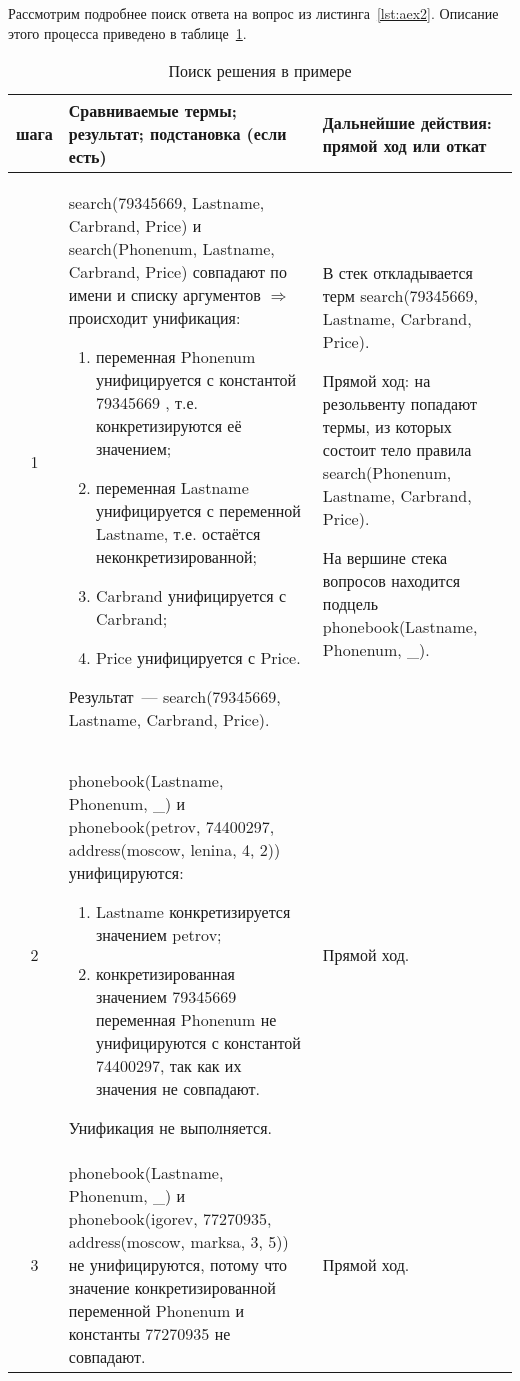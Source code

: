 Рассмотрим подробнее поиск ответа на вопрос из листинга~\ref{lst:aex2}. Описание этого процесса приведено в таблице~\ref{tbl:ex1}.
\renewcommand{\arraystretch}{1.75}
\footnotesize
\begin{longtable}{|c|p{}|p{}|}
    \caption{Поиск решения в примере }\label{tbl:ex1} \\
    \hline
    \textnumero{} шага & Сравниваемые термы; результат; подстановка (если есть)  & Дальнейшие действия: прямой ход или откат \\
    \hline
        1 & search(79345669, Lastname, Carbrand, Price) и search(Phonenum, Lastname, Carbrand, Price) совпадают по имени и списку аргументов $\Rightarrow$ происходит унификация:
        \begin{enumerate}[label=\arabic*)]
			\item переменная Phonenum унифицируется с константой 79345669 , т.е. конкретизируются её значением;
			\item переменная Lastname унифицируется с переменной Lastname, т.е. остаётся неконкретизированной;
			\item Carbrand унифицируется с Carbrand;
			\item Price унифицируется с Price.
 		\end{enumerate}
        Результат~--- search(79345669, Lastname, Carbrand, Price). &
        В стек откладывается терм search(79345669, Lastname, Carbrand, Price).

        Прямой ход: на резольвенту попадают термы, из которых состоит тело правила search(Phonenum, Lastname, Carbrand, Price).

        На вершине стека вопросов находится подцель phonebook(Lastname, Phonenum, \_).
        \\ \hline
        2 & phonebook(Lastname, Phonenum, \_) и phonebook(petrov, 74400297, address(moscow,    lenina,       4,  2)) унифицируются:
        \begin{enumerate}[label=\arabic*)]
            \item Lastname конкретизируется значением petrov;
            \item конкретизированная значением 79345669 переменная Phonenum не унифицируются с константой 74400297, так как их значения не совпадают.
        \end{enumerate}
        Унификация не выполняется. & Прямой ход. \\ \hline

        3 & phonebook(Lastname, Phonenum, \_) и phonebook(igorev, 77270935, address(moscow,    marksa,       3,  5)) не унифицируются, потому что значение конкретизированной переменной Phonenum и константы 77270935 не совпадают. & Прямой ход. \\ \hline


\end{longtable}
